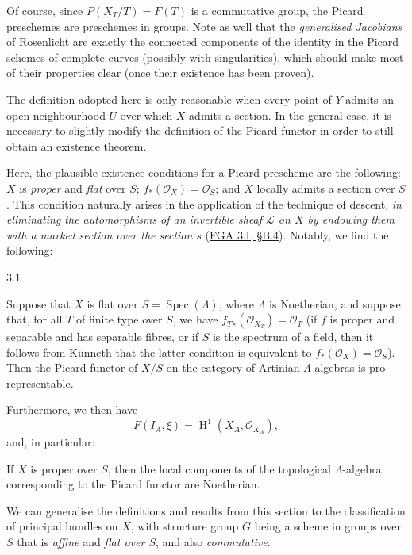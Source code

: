   Of course, since \(P(X_T/T)=F(T)\) is a commutative group, the Picard preschemes are preschemes in groups.
  Note as well that the \emph{generalised Jacobians} of Rosenlicht are exactly the connected components of the identity in the Picard schemes of complete curves (possibly with singularities), which should make most of their properties clear (once their existence has been proven).\begin{remark}{}\label{fga3.ii-c.3-remark}\skipsinglepar\par{}The definition adopted here is only reasonable when every point of \(Y\) admits an open neighbourhood \(U\) over which \(X\) admits a section.
    In the general case, it is necessary to slightly modify the definition of the Picard functor in order to still obtain an existence theorem.\par{}Here, the plausible existence conditions for a Picard prescheme are the following: \(X\) is \emph{proper} and \emph{flat} over \(S\); \(f_*(\mathscr {O}_X)=\mathscr {O}_S\); and \(X\) locally admits a section over \(S\).
    This condition naturally arises in the application of the technique of descent, \emph{in eliminating the automorphisms of an invertible sheaf \(\mathscr {L}\) on \(X\) by endowing them with a marked section over the section \(s\)} (\hyperref[fga3.i-b.4]{FGA 3.I, §B.4}).
    Notably, we find the following:\end{remark}\begin{proposition}{3.1}\label{fga3.ii-c.3-proposition-3.1}\skipsinglepar\par{}Suppose that \(X\) is flat over \(S=\operatorname {Spec}(\Lambda )\), where \(\Lambda \) is Noetherian, and suppose that, for all \(T\) of finite type over \(S\), we have \({f_T}_*(\mathscr {O}_{X_T})=\mathscr {O}_T\) (if \(f\) is proper and separable and has separable fibres, or if \(S\) is the spectrum of a field, then it follows from Künneth that the latter condition is equivalent to \(f_*(\mathscr {O}_X)=\mathscr {O}_S\)).
    Then the Picard functor of \(X/S\) on the category of Artinian \(\Lambda \)-algebras is pro-representable.\par{}Furthermore, we then have
    \[       F(I_A,\xi )       = \operatorname {H}^1(X_A,\mathscr {O}_{X_A}),     \]
    and, in particular:\end{proposition}\begin{corollary}{}\label{fga3.ii-c.3-proposition-3.1-corollary}\skipsinglepar\par{}If \(X\) is proper over \(S\), then the local components of the topological \(\Lambda \)-algebra corresponding to the Picard functor are Noetherian.\end{corollary}\begin{remarks}{}\label{fga3.ii-c.3-remarks-i}\skipsinglepar\par{}We can generalise the definitions and results from this section to the classification of principal bundles on \(X\), with structure group \(G\) being a scheme in groups over \(S\) that is \emph{affine} and \emph{flat over \(S\)}, and also \emph{commutative}.

\end{remarks}
